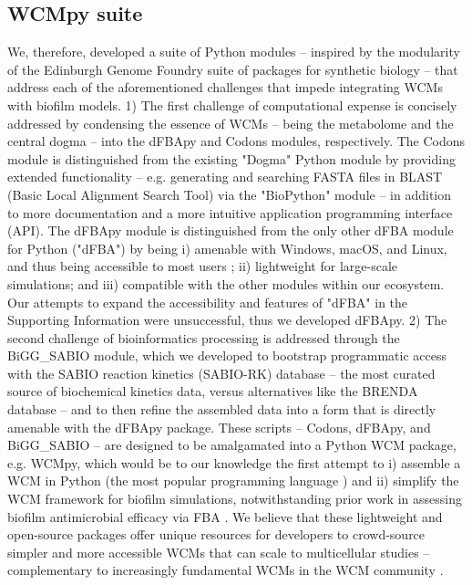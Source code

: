 \subsection{WCMpy suite}
We, therefore, developed a suite of Python modules -- inspired by the modularity of the Edinburgh Genome Foundry suite of packages \cite{Codons2021TheFoundry} for synthetic biology -- that address each of the aforementioned challenges that impede integrating WCMs with biofilm models. 1) The first challenge of computational expense is concisely addressed by condensing the essence of WCMs -- being the metabolome and the central dogma -- into the dFBApy and Codons modules, respectively. The Codons module is distinguished from the existing "Dogma" Python module by providing extended functionality -- e.g. generating and searching FASTA files in BLAST (Basic Local Alignment Search Tool) via the "BioPython" module \cite{Cock2009Biopython:Bioinformatics} -- in addition to more documentation and a more intuitive application programming interface (API). The dFBApy module is distinguished from the only other dFBA module for Python ("dFBA") by being i) amenable with Windows, macOS, and Linux, and thus being accessible to most users \cite{StatistaMarket2021}; ii) lightweight for large-scale simulations; and iii) compatible with the other modules within our ecosystem. Our attempts to expand the accessibility and features of "dFBA" in the Supporting Information were unsuccessful, thus we developed dFBApy. 2) The second challenge of bioinformatics processing is addressed through the BiGG\_SABIO module, which we developed to bootstrap programmatic access with the SABIO reaction kinetics (SABIO-RK) database \cite{Wittig2012} -- the most curated source of biochemical kinetics data, versus alternatives like the BRENDA database \cite{Chang2021} -- and to then refine the assembled data into a form that is directly amenable with the dFBApy package. These scripts -- Codons, dFBApy, and BiGG\_SABIO -- are designed to be amalgamated into a Python WCM package, e.g. WCMpy, which would be to our knowledge the first attempt to i) assemble a WCM in Python (the most popular programming language \cite{TIOBE2022}) and ii) simplify the WCM framework for biofilm simulations, notwithstanding prior work in assessing biofilm antimicrobial efficacy via FBA \cite{Sigurdsson2012ABiofilm}. We believe that these lightweight and open-source packages offer unique resources for developers to crowd-source simpler and more accessible WCMs that can scale to multicellular studies -- complementary to increasingly fundamental WCMs \cite{Maritan2022BuildingCell} in the WCM community \cite{Goldberg2018EmergingMethods,Shepelin2020BenchmarkingMetabolism}. 

